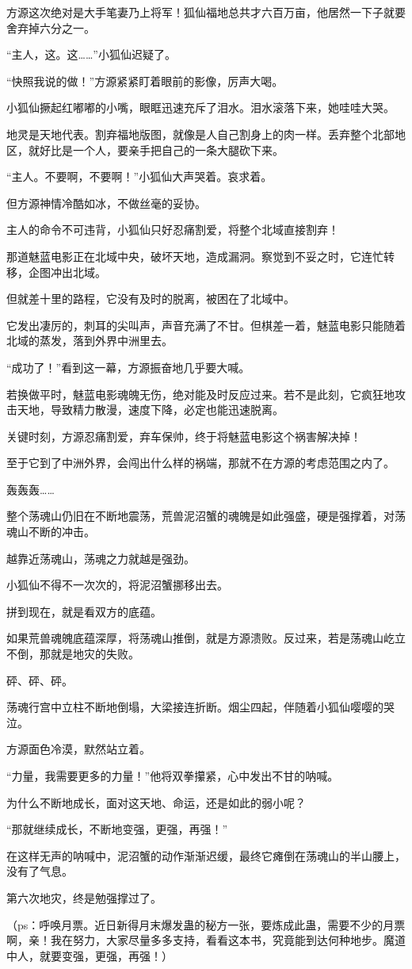 \begin{this_body}
方源这次绝对是大手笔妻乃上将军！狐仙福地总共才六百万亩，他居然一下子就要舍弃掉六分之一。

“主人，这。这……”小狐仙迟疑了。

“快照我说的做！”方源紧紧盯着眼前的影像，厉声大喝。

小狐仙撅起红嘟嘟的小嘴，眼眶迅速充斥了泪水。泪水滚落下来，她哇哇大哭。

地灵是天地代表。割弃福地版图，就像是人自己割身上的肉一样。丢弃整个北部地区，就好比是一个人，要亲手把自己的一条大腿砍下来。

“主人。不要啊，不要啊！”小狐仙大声哭着。哀求着。

但方源神情冷酷如冰，不做丝毫的妥协。

主人的命令不可违背，小狐仙只好忍痛割爱，将整个北域直接割弃！

那道魅蓝电影正在北域中央，破坏天地，造成漏洞。察觉到不妥之时，它连忙转移，企图冲出北域。

但就差十里的路程，它没有及时的脱离，被困在了北域中。

它发出凄厉的，刺耳的尖叫声，声音充满了不甘。但棋差一着，魅蓝电影只能随着北域的蒸发，落到外界中洲里去。

“成功了！”看到这一幕，方源振奋地几乎要大喊。

若换做平时，魅蓝电影魂魄无伤，绝对能及时反应过来。若不是此刻，它疯狂地攻击天地，导致精力散漫，速度下降，必定也能迅速脱离。

关键时刻，方源忍痛割爱，弃车保帅，终于将魅蓝电影这个祸害解决掉！

至于它到了中洲外界，会闯出什么样的祸端，那就不在方源的考虑范围之内了。

轰轰轰……

整个荡魂山仍旧在不断地震荡，荒兽泥沼蟹的魂魄是如此强盛，硬是强撑着，对荡魂山不断的冲击。

越靠近荡魂山，荡魂之力就越是强劲。

小狐仙不得不一次次的，将泥沼蟹挪移出去。

拼到现在，就是看双方的底蕴。

如果荒兽魂魄底蕴深厚，将荡魂山推倒，就是方源溃败。反过来，若是荡魂山屹立不倒，那就是地灾的失败。

砰、砰、砰。

荡魂行宫中立柱不断地倒塌，大梁接连折断。烟尘四起，伴随着小狐仙嘤嘤的哭泣。

方源面色冷漠，默然站立着。

“力量，我需要更多的力量！”他将双拳攥紧，心中发出不甘的呐喊。

为什么不断地成长，面对这天地、命运，还是如此的弱小呢？

“那就继续成长，不断地变强，更强，再强！”

在这样无声的呐喊中，泥沼蟹的动作渐渐迟缓，最终它瘫倒在荡魂山的半山腰上，没有了气息。

第六次地灾，终是勉强撑过了。

（ps：呼唤月票。近日新得月末爆发蛊的秘方一张，要炼成此蛊，需要不少的月票啊，亲！我在努力，大家尽量多多支持，看看这本书，究竟能到达何种地步。魔道中人，就要变强，更强，再强！）

\end{this_body}

